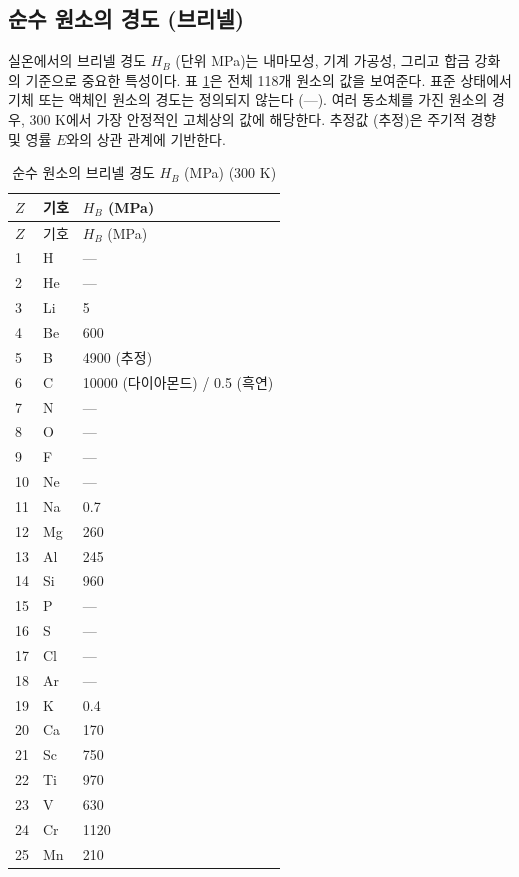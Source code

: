 \documentclass[12pt,a4paper]{article}
\begin{document}
	\subsection{순수 원소의 경도 (브리넬)}
	\label{subsec:hardness}
	
	실온에서의 브리넬 경도 \(H_B\) (단위 MPa)는 내마모성, 기계 가공성, 그리고 합금 강화의 기준으로 중요한 특성이다. 표 \ref{tab:hardness-all}은 전체 118개 원소의 값을 보여준다. 표준 상태에서 기체 또는 액체인 원소의 경도는 정의되지 않는다 (—). 여러 동소체를 가진 원소의 경우, 300 K에서 가장 안정적인 고체상의 값에 해당한다. 추정값 (추정)은 주기적 경향 및 영률 \(E\)와의 상관 관계에 기반한다.
	
	\begin{longtable}{p{0.6cm}p{1.2cm}p{2.5cm}}
		\caption{순수 원소의 브리넬 경도 \(H_B\) (MPa) (300 K)} \label{tab:hardness-all} \\
		\toprule
		\(Z\) & 기호 & \(H_B\) (MPa) \\
		\midrule
		\endfirsthead
		\toprule
		\(Z\) & 기호 & \(H_B\) (MPa) \\
		\midrule
		\endhead
		1  & H  & — \\
		2  & He & — \\
		3  & Li & 5 \\
		4  & Be & 600 \\
		5  & B  & 4900 (추정) \\
		6  & C  & 10000 (다이아몬드) / 0.5 (흑연) \\
		7  & N  & — \\
		8  & O  & — \\
		9  & F  & — \\
		10 & Ne & — \\
		11 & Na & 0.7 \\
		12 & Mg & 260 \\
		13 & Al & 245 \\
		14 & Si & 960 \\
		15 & P  & — \\
		16 & S  & — \\
		17 & Cl & — \\
		18 & Ar & — \\
		19 & K  & 0.4 \\
		20 & Ca & 170 \\
		21 & Sc & 750 \\
		22 & Ti & 970 \\
		23 & V  & 630 \\
		24 & Cr & 1120 \\
		25 & Mn & 210 \\

\end{longtable}
\end{document}
